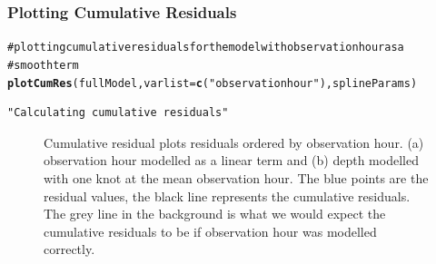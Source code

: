 \documentclass[11pt, a4paper]{article}
\makeatletter
\newcommand{\hlfunctioncall}[1]{\textcolor[rgb]{0.501960784313725,0,0.329411764705882}{\textbf{#1}}}%
\newcommand{\hlstring}[1]{\textcolor[rgb]{0.6,0.6,1}{#1}}%
\newcommand{\hlcomment}[1]{\textcolor[rgb]{0.180392156862745,0.6,0.341176470588235}{#1}}%
\newenvironment{kframe}{%
 \def\at@end@of@kframe{}%
 \ifinner\ifhmode%
  \def\at@end@of@kframe{\end{minipage}}%
  \begin{minipage}{\columnwidth}%
 \fi\fi%
 \def\FrameCommand##1{\hskip\@totalleftmargin \hskip-\fboxsep
 \colorbox{shadecolor}{##1}\hskip-\fboxsep
     \hskip-\linewidth \hskip-\@totalleftmargin \hskip\columnwidth}%
 \MakeFramed {\advance\hsize-\width
   \@totalleftmargin\z@ \linewidth\hsize
   \@setminipage}}%
 {\par\unskip\endMakeFramed%
 \at@end@of@kframe}
\newenvironment{knitrout}{}{} %
\makeatother
\begin{document}
\begin{frame}[fragile]
\frametitle{Plotting Cumulative Residuals}
\begin{knitrout}\footnotesize
{}\color{fgcolor}\begin{kframe}
\begin{alltt}
\hlcomment{# plotting cumulative residuals for the model with observationhour as a }
\hlcomment{# smooth term}
\hlfunctioncall{plotCumRes}(fullModel, varlist= \hlfunctioncall{c}(\hlstring{"observationhour"}), splineParams)
\end{alltt}
\begin{verbatim}
"Calculating cumulative residuals"
\end{verbatim}
\end{kframe}
\end{knitrout}

\begin{figure}[h]
  \centering
  \hfill
\caption{Cumulative residual plots residuals ordered by observation hour. (a) observation hour modelled as a linear term and (b) depth modelled with one knot at the mean observation hour.  The blue points are the residual values, the black line represents the cumulative residuals. The grey line in the background is what we would expect the cumulative residuals to be if observation hour was modelled correctly.}
\label{fig:cumres1}
\end{figure}
\end{frame}
\end{document}
